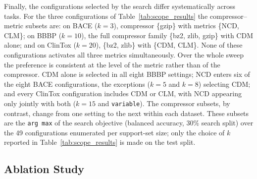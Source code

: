 Finally, the configurations selected by the search differ systematically across
tasks. For the three configurations of Table~\ref{tab:scope_results} the
compressor--metric subsets are: on BACE ($k=3$), compressor \{gzip\} with
metrics \{NCD, CLM\}; on BBBP ($k=10$), the full compressor family \{bz2, zlib,
gzip\} with CDM alone; and on ClinTox ($k=20$), \{bz2, zlib\} with \{CDM, CLM\}.
None of these configurations activates all three metrics simultaneously. Over
the whole sweep the preference is consistent at the level of the metric rather
than of the compressor. CDM alone is selected in all eight BBBP settings; NCD
enters six of the eight BACE configurations, the exceptions ($k=5$ and $k=8$)
selecting CDM; and every ClinTox configuration includes CDM or CLM, with NCD
appearing only jointly with both ($k=15$ and \texttt{variable}). The compressor
subsets, by contrast, change from one setting to the next within each dataset.
These subsets are the \texttt{arg\,max} of the search objective (balanced
accuracy, 30\% search split) over the 49 configurations enumerated per
support-set size; only the
choice of $k$ reported in Table~\ref{tab:scope_results} is made on the test
split.

\subsection{Ablation Study}\label{subsec:ablation}

